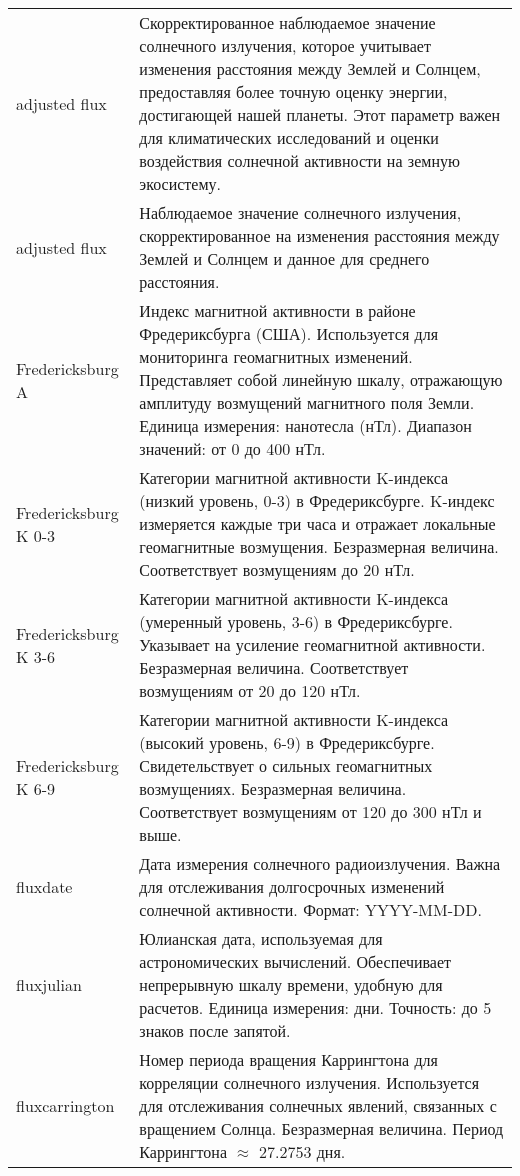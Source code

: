 \begin{longtable}{|l|p{12cm}|}
        \hline
        adjusted flux & Скорректированное наблюдаемое значение солнечного излучения, которое учитывает изменения расстояния между Землей и Солнцем, предоставляя более точную оценку энергии, достигающей нашей планеты. Этот параметр важен для климатических исследований и оценки воздействия солнечной активности на земную экосистему.\\
        adjusted flux & Наблюдаемое значение солнечного излучения, скорректированное на изменения расстояния между Землей и Солнцем и данное для среднего расстояния.\\
        \hline
        Fredericksburg A & Индекс магнитной активности в районе Фредериксбурга (США). Используется для мониторинга геомагнитных изменений. Представляет собой линейную шкалу, отражающую амплитуду возмущений магнитного поля Земли. Единица измерения: нанотесла (нТл). Диапазон значений: от 0 до 400 нТл. \\
        \hline
        Fredericksburg K 0-3 & Категории магнитной активности K-индекса (низкий уровень, 0-3) в Фредериксбурге. K-индекс измеряется каждые три часа и отражает локальные геомагнитные возмущения. Безразмерная величина. Соответствует возмущениям до 20 нТл. \\
        \hline
        Fredericksburg K 3-6 & Категории магнитной активности K-индекса (умеренный уровень, 3-6) в Фредериксбурге. Указывает на усиление геомагнитной активности. Безразмерная величина. Соответствует возмущениям от 20 до 120 нТл. \\
        \hline
        Fredericksburg K 6-9 & Категории магнитной активности K-индекса (высокий уровень, 6-9) в Фредериксбурге. Свидетельствует о сильных геомагнитных возмущениях. Безразмерная величина. Соответствует возмущениям от 120 до 300 нТл и выше. \\
        \hline
        fluxdate & Дата измерения солнечного радиоизлучения. Важна для отслеживания долгосрочных изменений солнечной активности. Формат: YYYY-MM-DD. \\
        \hline
        fluxjulian & Юлианская дата, используемая для астрономических вычислений. Обеспечивает непрерывную шкалу времени, удобную для расчетов. Единица измерения: дни. Точность: до 5 знаков после запятой. \\
        \hline
        fluxcarrington & Номер периода вращения Каррингтона для корреляции солнечного излучения. Используется для отслеживания солнечных явлений, связанных с вращением Солнца. Безразмерная величина. Период Каррингтона $\approx$ 27.2753 дня. \\

\end{longtable}
